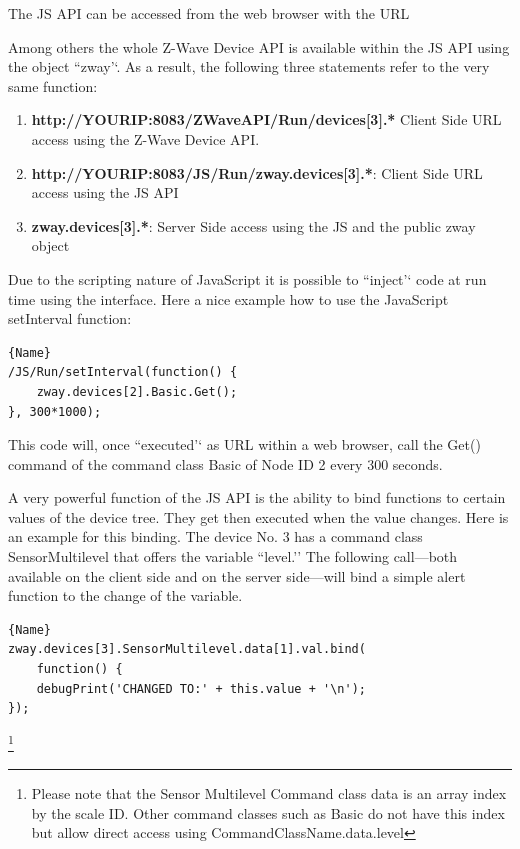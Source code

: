 The JS API can be accessed from the web browser with the URL



Among others the whole Z-Wave Device API is available within the JS API using 
the object ``zway’‘. As a result, the following three statements refer to the very same function:

\begin{enumerate}
\item \textbf{http://YOURIP:8083/ZWaveAPI/Run/devices[3].*} Client Side URL access using the Z-Wave Device API.
\item \textbf{http://YOURIP:8083/JS/Run/zway.devices[3].*}: Client Side URL access using the JS API
\item \textbf{zway.devices[3].*}: Server Side access using the JS and the public zway object
\end{enumerate}

Due to the scripting nature of JavaScript it is possible to ``inject’‘ code at run time 
using the interface. Here a nice example how to use the JavaScript setInterval function:

\begin{lstlisting}[caption=Polling of device \#2, basicstyle=\small]{Name}
/JS/Run/setInterval(function() {
	zway.devices[2].Basic.Get();
}, 300*1000);
\end{lstlisting}

This code will, once ``executed’‘ as URL within a web browser, call the Get() command
of the command class Basic of Node ID 2 every 300 seconds.

A very powerful function of the JS API is the ability to bind functions to certain values 
of the device tree. They get then executed when the value changes. Here is an example 
for this binding. The device No. 3 has a command class SensorMultilevel that offers 
the variable ``level.’’ The following call---both available on the client side and 
on the server side---will bind a simple alert function to the change of the variable.

\begin{lstlisting}[caption=Bind a function, basicstyle=\small]{Name}
zway.devices[3].SensorMultilevel.data[1].val.bind( 
	function() {
	debugPrint('CHANGED TO:' + this.value + '\n');
});
\end{lstlisting}

\footnote{Please note that the Sensor Multilevel Command class data is an array index 
by the scale ID. Other command classes such as Basic do not have this index but allow 
direct access using CommandClassName.data.level}

